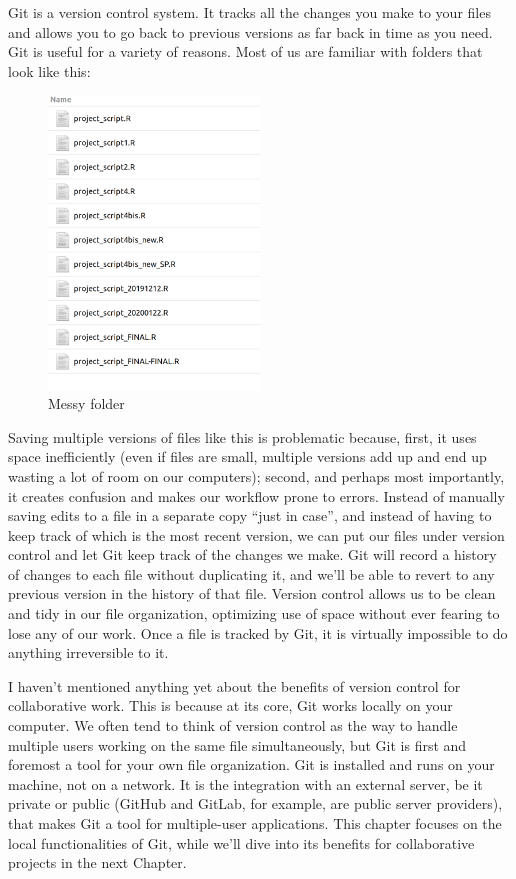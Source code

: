 \documentclass[
]{book}
\begin{document}
Git is a version control system. It tracks all the changes you make to your files and allows you to go back to previous versions as far back in time as you need. Git is useful for a variety of reasons. Most of us are familiar with folders that look like this:

\begin{figure}
\centering
\includegraphics[width=0.5\textwidth,height=\textheight]{img/version-nightmare.png}
\caption{Messy folder}
\end{figure}

Saving multiple versions of files like this is problematic because, first, it uses space inefficiently (even if files are small, multiple versions add up and end up wasting a lot of room on our computers); second, and perhaps most importantly, it creates confusion and makes our workflow prone to errors. Instead of manually saving edits to a file in a separate copy ``just in case'', and instead of having to keep track of which is the most recent version, we can put our files under version control and let Git keep track of the changes we make. Git will record a history of changes to each file without duplicating it, and we'll be able to revert to any previous version in the history of that file. Version control allows us to be clean and tidy in our file organization, optimizing use of space without ever fearing to lose any of our work. Once a file is tracked by Git, it is virtually impossible to do anything irreversible to it.

I haven't mentioned anything yet about the benefits of version control for collaborative work. This is because at its core, Git works locally on your computer. We often tend to think of version control as the way to handle multiple users working on the same file simultaneously, but Git is first and foremost a tool for your own file organization. Git is installed and runs on your machine, not on a network. It is the integration with an external server, be it private or public (GitHub and GitLab, for example, are public server providers), that makes Git a tool for multiple-user applications. This chapter focuses on the local functionalities of Git, while we'll dive into its benefits for collaborative projects in the next Chapter.
\end{document}
